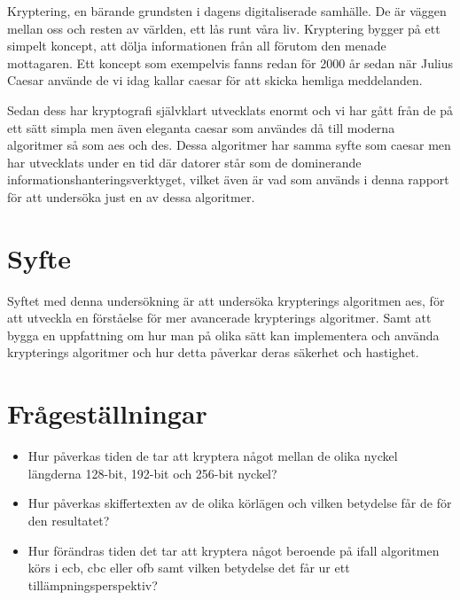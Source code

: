 Kryptering, en bärande grundsten i dagens digitaliserade samhälle. De är väggen mellan oss och resten
av världen, ett lås runt våra liv. Kryptering bygger på ett simpelt koncept, att dölja informationen
från all förutom den menade mottagaren. Ett koncept som exempelvis fanns redan för 2000 år sedan när Julius
Caesar använde de vi idag kallar \gls{caesar} för att skicka hemliga meddelanden.

Sedan dess har kryptografi självklart utvecklats enormt och vi har gått från de på ett sätt simpla men
även eleganta \gls{caesar} som användes då till moderna algoritmer så som \acrlong{aes} och \acrlong{des}.
Dessa algoritmer har samma syfte som \gls{caesar} men har utvecklats under en tid där datorer står som
de dominerande informationshanteringsverktyget, vilket även är vad som används i denna rapport för att
undersöka just en av dessa algoritmer.

\section{Syfte} %
Syftet med denna undersökning är att undersöka krypterings algoritmen \acrshort{aes},
för att utveckla en förståelse för mer avancerade krypterings algoritmer.
Samt att bygga en uppfattning om hur man på olika sätt kan implementera och använda
krypterings algoritmer och hur detta påverkar deras säkerhet och hastighet.

\section{Frågeställningar} %
\begin{itemize}
    \setlength{\itemindent}{-1em}
    \item Hur påverkas tiden de tar att kryptera något mellan de olika nyckel längderna 128-bit,
          192-bit och 256-bit nyckel?

    \item Hur påverkas skiffertexten av de olika körlägen och vilken betydelse får de för den resultatet?

    \item Hur förändras tiden det tar att kryptera något beroende på ifall algoritmen körs i
          \acrshort{ecb}, \acrshort{cbc} eller \acrshort{ofb} samt vilken betydelse det får ur ett
          tillämpningsperspektiv?
\end{itemize}

